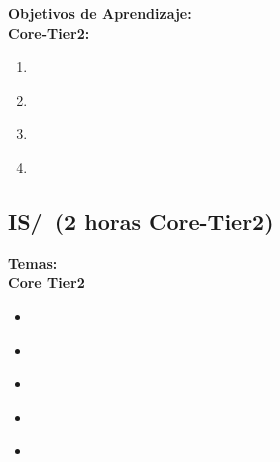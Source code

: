 \noindent \textbf{Objetivos de Aprendizaje:}\\
\noindent \textbf{Core-Tier2:}
\begin{enumerate}
	\setcounter{enumi}{0}
	\item \ISBasicKnowledgeRepresentationandReasoningLOTranslate\xspace[\ISBasicKnowledgeRepresentationandReasoningLOTranslateLevel]\label{sec:BOK:ISBasicKnowledgeRepresentationandReasoningLOTranslate}
	\item \ISBasicKnowledgeRepresentationandReasoningLOConvertA\xspace[\ISBasicKnowledgeRepresentationandReasoningLOConvertALevel]\label{sec:BOK:ISBasicKnowledgeRepresentationandReasoningLOConvertA}
	\item \ISBasicKnowledgeRepresentationandReasoningLOApplyResolution\xspace[\ISBasicKnowledgeRepresentationandReasoningLOApplyResolutionLevel]\label{sec:BOK:ISBasicKnowledgeRepresentationandReasoningLOApplyResolution}
	\item \ISBasicKnowledgeRepresentationandReasoningLOMake\xspace[\ISBasicKnowledgeRepresentationandReasoningLOMakeLevel]\label{sec:BOK:ISBasicKnowledgeRepresentationandReasoningLOMake}
\end{enumerate}


\subsection{IS/\ISBasicMachineLearning~(2 horas Core-Tier2)}\label{sec:BOK:ISBasicMachineLearning}
\noindent \textbf{Temas:}\\
\noindent \textbf{Core Tier2}
\begin{itemize}
	\item \ISBasicMachineLearningTopicDefinition\label{sec:BOK:ISBasicMachineLearningTopicDefinition}
	\item \ISBasicMachineLearningTopicInductive\label{sec:BOK:ISBasicMachineLearningTopicInductive}
	\item \ISBasicMachineLearningTopicSimple\label{sec:BOK:ISBasicMachineLearningTopicSimple}
	\item \ISBasicMachineLearningTopicThe\label{sec:BOK:ISBasicMachineLearningTopicThe}
	\item \ISBasicMachineLearningTopicMeasuring\label{sec:BOK:ISBasicMachineLearningTopicMeasuring}
\end{itemize}


